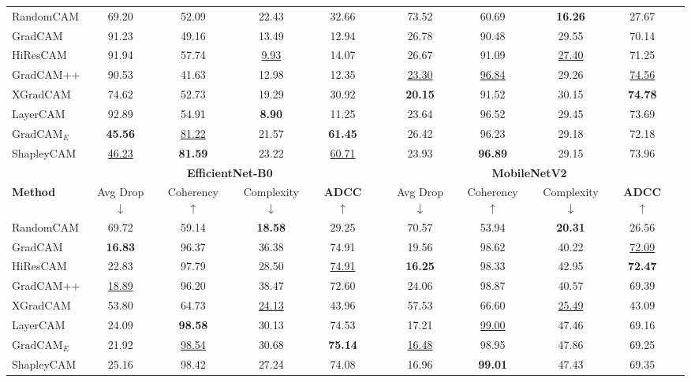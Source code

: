 \begin{table*}[htbp]
\begin{tabular}{l cccc c cccc c}
\hline
RandomCAM & 69.20 & 52.09 & 22.43 & 32.66 & & 73.52 & 60.69 & \textbf{16.26} & 27.67 \\
GradCAM & 91.23 & 49.16 & 13.49 & 12.94 & & 26.78 & 90.48 & 29.55 & 70.14 \\
HiResCAM & 91.94 & 57.74 & \underline{9.93} & 14.07 & & 26.67 & 91.09 & \underline{27.40} & 71.25 \\
GradCAM++ & 90.53 & 41.63 & 12.98 & 12.35 & & \underline{23.30} & \underline{96.84} & 29.26 & \underline{74.56} \\
XGradCAM & 74.62 & 52.73 & 19.29 & 30.92 & & \textbf{20.15} & 91.52 & 30.15 & \textbf{74.78} \\
LayerCAM & 92.89 & 54.91 & \textbf{8.90} & 11.25 & & 23.64 & 96.52 & 29.45 & 73.69 \\
$\text{GradCAM}_{E}$ & \textbf{45.56} & \underline{81.22} & 21.57 & \textbf{61.45} & & 26.42 & 96.23 & 29.18 & 72.18 \\
ShapleyCAM & \underline{46.23} & \textbf{81.59} & 23.22 & \underline{60.71} & & 23.93 & \textbf{96.89} & 29.15 & 73.96 \\
\hline
& \multicolumn{4}{c}{\textbf{EfficientNet-B0}} & & \multicolumn{4}{c}{\textbf{MobileNetV2}} \\
\cline{2-5} \cline{7-10}
\textbf{Method} & Avg Drop $\downarrow$ & Coherency $\uparrow$ & Complexity $\downarrow$ & \textbf{ADCC} $\uparrow$ & & Avg Drop $\downarrow$ & Coherency $\uparrow$ & Complexity $\downarrow$ & \textbf{ADCC} $\uparrow$ \\
\hline
RandomCAM & 69.72 & 59.14 & \textbf{18.58} & 29.25 & & 70.57 & 53.94 & \textbf{20.31} & 26.56 \\
GradCAM & \textbf{16.83} & 96.37 & 36.38 & 74.91 & & 19.56 & 98.62 & 40.22 & \underline{72.09} \\
HiResCAM & 22.83 & 97.79 & 28.50 & \underline{74.91} & & \textbf{16.25} & 98.33 & 42.95 & \textbf{72.47} \\
GradCAM++ & \underline{18.89} & 96.20 & 38.47 & 72.60 & & 24.06 & 98.87 & 40.57 & 69.39 \\
XGradCAM & 53.80 & 64.73 & \underline{24.13} & 43.96 & & 57.53 & 66.60 & \underline{25.49} & 43.09 \\
LayerCAM & 24.09 & \textbf{98.58} & 30.13 & 74.53 & & 17.21 & \underline{99.00} & 47.46 & 69.16 \\
$\text{GradCAM}_{E}$ & 21.92 & \underline{98.54} & 30.68 & \textbf{75.14} & & \underline{16.48} & 98.95 & 47.86 & 69.25 \\
ShapleyCAM & 25.16 & 98.42 & 27.24 & 74.08 & & 16.96 & \textbf{99.01} & 47.43 & 69.35 \\
\hline
\end{tabular}
\end{table*}